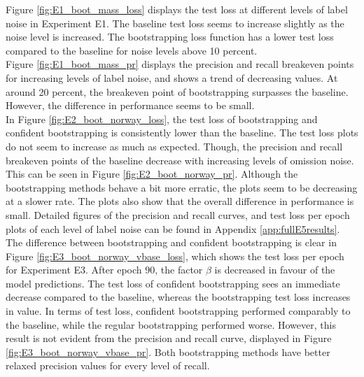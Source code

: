 Figure \ref{fig:E1_boot_mass_loss} displays the test loss at different levels of label noise in Experiment E1. The baseline test loss seems to increase slightly as the noise level is increased. The bootstrapping loss function has a lower test loss compared to the baseline for  noise levels above 10 percent.\\

Figure \ref{fig:E1_boot_mass_pr} displays the precision and recall breakeven points for  increasing levels of label noise, and shows a trend of decreasing values.  At around 20 percent, the breakeven point of bootstrapping surpasses the baseline. However, the difference in performance seems to be small.\\

In Figure \ref{fig:E2_boot_norway_loss}, the test loss of bootstrapping and confident bootstrapping is consistently lower than the baseline. The test loss plots do not seem to increase as much as expected. Though, the precision and recall breakeven points of the baseline decrease with increasing levels of omission noise. This can be seen in Figure \ref{fig:E2_boot_norway_pr}. Although the bootstrapping methods behave a bit more erratic, the plots seem to be decreasing at a slower rate. The plots also show that the overall difference in performance is small. Detailed figures of the precision and recall curves, and test loss per epoch plots of each level of label noise can be found in Appendix \ref{app:fullE5results}. \\

The difference between bootstrapping and confident bootstrapping is clear in Figure \ref{fig:E3_boot_norway_vbase_loss}, which shows the test loss per epoch for Experiment E3. After epoch 90, the factor $\beta$ is decreased in favour of the model predictions. The test loss of confident bootstrapping sees an immediate decrease compared to the baseline, whereas the bootstrapping test loss increases in value. In terms of test loss, confident bootstrapping performed comparably to the baseline, while the regular bootstrapping performed worse. However, this result is not evident from the precision and recall curve, displayed in Figure \ref{fig:E3_boot_norway_vbase_pr}. Both bootstrapping methods have better relaxed precision values  for every level of recall. \\

